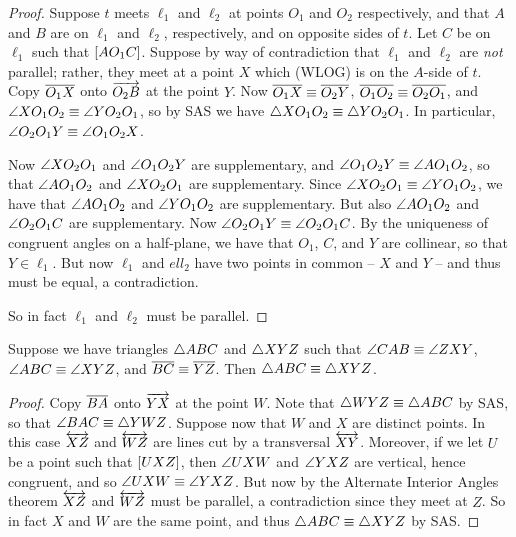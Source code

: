 \begin{proof}
Suppose \(t\) meets \(\ell_1\) and \(\ell_2\) at points \(O_1\) and \(O_2\) respectively, and that \(A\) and \(B\) are on \(\ell_1\) and \(\ell_2\), respectively, and on opposite sides of \(t\). Let \(C\) be on \(\ell_1\) such that \([ A O_1 C ]\). Suppose by way of contradiction that \(\ell_1\) and \(\ell_2\) are \emph{not} parallel; rather, they meet at a point \(X\) which (WLOG) is on the \(A\)-side of \(t\). Copy \(\overline{O_1X}\) onto \(\overrightarrow{O_2B}\) at the point \(Y\). Now \(\overline{O_1X} \equiv \overline{O_2Y}\), \(\overline{O_1O_2} \equiv \overline{O_2O_1}\), and \(\angle{XO_1O_2} \equiv \angle{YO_2O_1}\), so by SAS we have \(\bigtriangleup{XO_1O_2} \equiv \bigtriangleup{YO_2O_1}\). In particular, \(\angle{O_2O_1Y} \equiv \angle{O_1O_2X}\).

Now \(\angle{XO_2O_1}\) and \(\angle{O_1O_2Y}\) are supplementary, and \(\angle{O_1O_2Y} \equiv \angle{AO_1O_2}\), so that \(\angle{AO_1O_2}\) and \(\angle{XO_2O_1}\) are supplementary. Since \(\angle{XO_2O_1} \equiv \angle{YO_1O_2}\), we have that \(\angle{AO_1O_2}\) and \(\angle{YO_1O_2}\) are supplementary. But also \(\angle{AO_1O_2}\) and \(\angle{O_2O_1C}\) are supplementary. Now \(\angle{O_2O_1Y} \equiv \angle{O_2O_1C}\). By the uniqueness of congruent angles on a half-plane, we have that \(O_1\), \(C\), and \(Y\) are collinear, so that \(Y \in \ell_1\). But now \(\ell_1\) and \(ell_2\) have two points in common -- \(X\) and \(Y\) -- and thus must be equal, a contradiction.

So in fact \(\ell_1\) and \(\ell_2\) must be parallel.  
\end{proof}

\begin{prop}[AAS]
Suppose we have triangles \(\bigtriangleup{ABC}\) and \(\bigtriangleup{XYZ}\) such that \(\angle{CAB} \equiv \angle{ZXY}\), \(\angle{ABC} \equiv \angle{XYZ}\), and \(\overline{BC} \equiv \overline{YZ}\).
Then \(\bigtriangleup{ABC} \equiv \bigtriangleup{XYZ}\).
\end{prop}

\begin{proof}
Copy \(\overline{BA}\) onto \(\overrightarrow{YX}\) at the point \(W\).
Note that \(\bigtriangleup{WYZ} \equiv \bigtriangleup{ABC}\) by SAS, so that \(\angle{BAC} \equiv \bigtriangleup{YWZ}\).
Suppose now that \(W\) and \(X\) are distinct points.
In this case \(\overleftrightarrow{XZ}\) and \(\overleftrightarrow{WZ}\) are lines cut by a transversal \(\overleftrightarrow{XY}\).
Moreover, if we let \(U\) be a point such that \([ U X Z ]\), then \(\angle{UXW}\) and \(\angle{YXZ}\) are vertical, hence congruent, and so \(\angle{UXW} \equiv \angle{YXZ}\).
But now by the Alternate Interior Angles theorem \(\overleftrightarrow{XZ}\) and \(\overleftrightarrow{WZ}\) must be parallel, a contradiction since they meet at \(Z\).
So in fact \(X\) and \(W\) are the same point, and thus \(\bigtriangleup{ABC} \equiv \bigtriangleup{XYZ}\) by SAS.
\end{proof}

